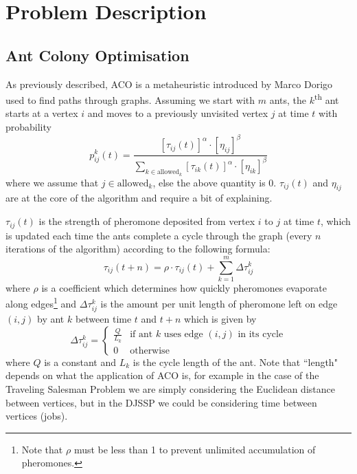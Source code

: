 \documentclass[final-report]{report-template}
\begin{document}
\section{Problem Description}
\subsection{Ant Colony Optimisation} \label{ACO}
As previously described, ACO is a metaheuristic introduced by Marco Dorigo \cite{484436} used to find paths through graphs. Assuming we start with $m$ ants, the $k$\textsuperscript{th} ant starts at a vertex $i$ and moves to a previously unvisited vertex $j$ at time $t$ with probability 
\begin{equation*}
    p_{ij}^k(t) = \frac{\left[\tau_{ij}(t)\right]^\alpha \cdot \left[\eta_{ij}\right]^\beta}{\sum_{k \in \text{allowed}_k}\left[\tau_{ik}(t)\right]^\alpha \cdot \left[\eta_{ik}\right]^\beta}
\end{equation*}
where we assume that $j\in \text{allowed}_k$, else the above quantity is 0. $\tau_{ij}(t)$ and $\eta_{ij}$ are at the core of the algorithm and require a bit of explaining.

$\tau_{ij}(t)$ is the strength of pheromone deposited from vertex $i$ to $j$ at time $t$, which is updated each time the ants complete a cycle through the graph (every $n$ iterations of the algorithm) according to the following formula:
\begin{equation*}
    \tau_{ij}(t + n) = \rho\cdot\tau_{ij}(t) + \sum_{k=1}^m\Delta\tau_{ij}^k
\end{equation*}
where $\rho$ is a coefficient which determines how quickly pheromones evaporate along edges\footnote{Note that $\rho$ must be less than 1 to prevent unlimited accumulation of pheromones.} and $\Delta\tau_{ij}^k$ is the amount per unit length of pheromone left on edge $(i, j)$ by ant $k$ between time $t$ and $t + n$ which is given by
\[
\Delta\tau_{ij}^k = 
\begin{cases}
    \frac{Q}{L_k} & \text{if ant $k$ uses edge $(i, j)$ in its cycle}\\
    0 & \text{otherwise}
\end{cases}
\]
where $Q$ is a constant and $L_k$ is the cycle length of the ant. Note that ``length" depends on what the application of ACO is, for example in the case of the Traveling Salesman Problem \cite{enwiki:1292600322} we are simply considering the Euclidean distance between vertices, but in the DJSSP we could be considering time between vertices (jobs).
\end{document}
